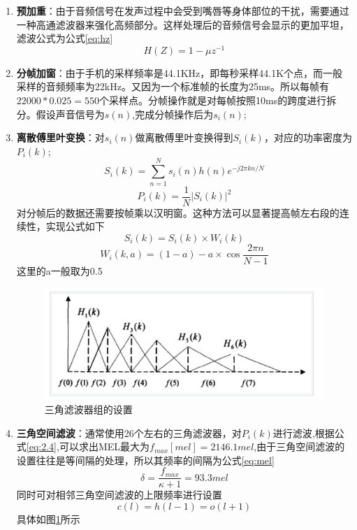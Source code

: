 \begin{enumerate}
    \item \textbf{预加重}：由于音频信号在发声过程中会受到嘴唇等身体部位的干扰，需要通过一种高通滤波器来强化高频部分。这样处理后的音频信号会显示的更加平坦，滤波公式为公式\ref{eq:hz}
    \begin{equation}
        H(Z) = 1 - \mu z^{-1}
        \label{eq:hz}
    \end{equation}
    \item \textbf{分帧加窗}：由于手机的采样频率是44.1KHz，即每秒采样44.1K个点，而一般采样的音频频率为22kHz。又因为一个标准帧的长度为25ms。所以每帧有\(22000*0.025 = 550\)个采样点。分帧操作就是对每帧按照10ms的跨度进行拆分。假设声音信号为\(s(n)\),完成分帧操作后为\(s_i(n)\);
    \item \textbf{离散傅里叶变换}：对\(s_i(n)\)做离散傅里叶变换得到\(S_i(k)\)，对应的功率密度为\(P_i(k)\);
    \begin{equation}
        S_i(k) = \sum_{n=1}^N s_i(n)h(n)e^{-j2{\pi}kn/N}
    \end{equation}
    \begin{equation}
        P_i(k) = \frac{1}{N}|S_i(k)|^2
    \end{equation}
    对分帧后的数据还需要按帧乘以汉明窗。这种方法可以显著提高帧左右段的连续性，实现公式如下
    \begin{equation}
        S_i(k) = S_i(k)\times W_i(k)
    \end{equation}
    \begin{equation}
        W_i(k,a) = (1-a)-a\times \cos{\frac{2\pi n}{N-1}}
    \end{equation}
    这里的a一般取为0.5
    \begin{figure}[h]
      \centering
      \includegraphics[width=\textwidth]{figures/三角滤波器.jpg}
      \caption{三角滤波器组的设置}
      \label{fig:sanjiao}
    \end{figure}
    \item \textbf{三角空间滤波}：通常使用26个左右的三角滤波器，对\(P_i(k)\)进行滤波,根据公式\ref{eq:2.4},可以求出MEL最大为\(f_{max}[mel] = 2146.1mel\),由于三角空间滤波的设置往往是等间隔的处理，所以其频率的间隔为公式\ref{eq:mel}
    \begin{equation}
        \delta = \frac{f_{max}}{\kappa+1}=93.3 mel
        \label{eq:mel}
    \end{equation}
    同时可对相邻三角空间滤波的上限频率进行设置
    \begin{equation}
        c(l) = h(l-1)=o(l+1)
    \end{equation}
    具体如图\ref{fig:sanjiao}所示


\end{enumerate}
